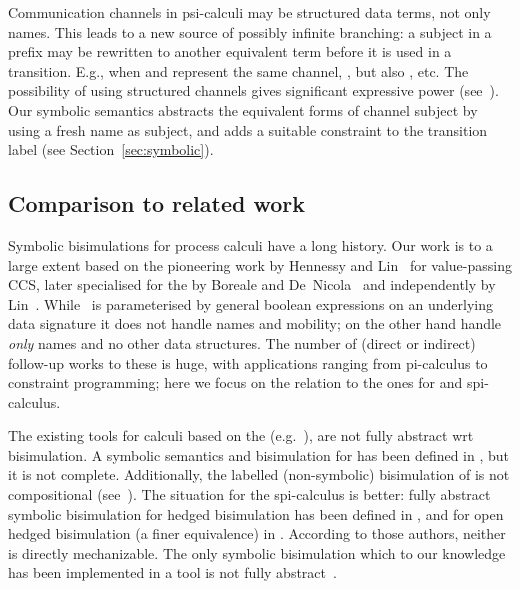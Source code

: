 \documentclass{eptcs}
\theoremstyle{definition}
\begin{document}
Communication channels in psi-calculi may be structured data terms,
not only names. This leads to a new source of possibly infinite
branching: a subject in a prefix may be rewritten to another
equivalent term before it is used in a transition. E.g., when 
and  represent the same channel,
, but also ,
etc. The possibility of using
structured channels gives significant expressive power
(see~\cite{bengtson.johansson.ea:psi-calculi}). Our symbolic semantics
abstracts the equivalent forms of channel subject by using a fresh
name as subject, and adds a suitable constraint to the transition
label (see Section~\ref{sec:symbolic}).




\subsection{Comparison to related work}
Symbolic bisimulations for process calculi have a long history.
Our work is to a large extent based on the pioneering work by Hennessy
and Lin~\cite{hennessy.lin:symbolic-bisimulations} for value-passing
CCS, later specialised for the \pic{} by Boreale and
De~Nicola~\cite{boreale.de-nicola:symbolic-semantics} and independently
by Lin~\cite{lin:symbolic-transition,lin:computing-bisimulations}.
While~\cite{hennessy.lin:symbolic-bisimulations} is
parameterised by general boolean expressions on an underlying data
signature it does not handle names and mobility; on the other hand
\cite{boreale.de-nicola:symbolic-semantics,lin:symbolic-transition,lin:computing-bisimulations}
handle \emph{only} names and no other data structures.
The number of (direct or indirect) follow-up works to these is huge,
with applications ranging from pi-calculus to constraint programming;
here we focus on the relation to the ones for \api{} and spi-calculus.

The existing tools for calculi based on the \api{}
(e.g.~\cite{abadi.blanchet:analyzing-security,blanchet:efficient-cryptographic,blanchet.abadi.ea:automated-verification}),
are not fully abstract wrt bisimulation.  A symbolic
semantics and bisimulation for \api{} has been defined in
\cite{DBLP:conf/fsttcs/DelauneKR07}, but it is not complete.
Additionally, the labelled (non-symbolic) bisimulation of \api{} is
not compositional (see~\cite{bengtson.johansson.ea:psi-calculi}).
The situation for
the spi-calculus is better: fully abstract symbolic bisimulation for hedged
bisimulation has been defined in
\cite{borgstroem:equivalences-calculi}, and for open hedged
bisimulation (a finer equivalence) in \cite{briais:theory-tool}.  
According to those authors, neither is directly mechanizable.
The only symbolic
bisimulation which to our knowledge has been implemented in a tool is
not fully abstract~\cite{borgstroem.briais.ea:symbolic-bisimulation}.
\end{document}
